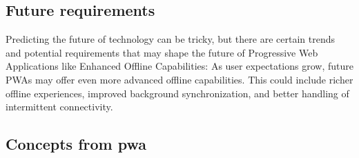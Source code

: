 \documentclass[12pt,a4paper, twosite]{article}
\begin{document}
\subsection{Future requirements}
\label{sec:org33cfcdb}

Predicting the future of technology can be tricky, but there are certain trends and potential requirements that may shape the future of Progressive Web Applications like Enhanced Offline Capabilities: As user expectations grow, future PWAs may offer even more advanced offline capabilities. This could include richer offline experiences, improved background synchronization, and better handling of intermittent connectivity.

\subsection{Concepts from pwa}
\label{sec:org24980a9}
\end{document}

